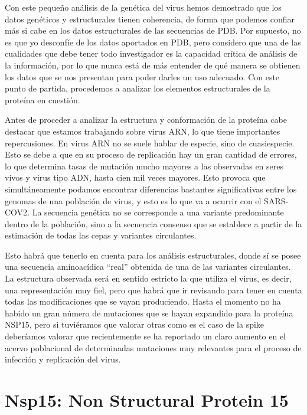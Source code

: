 \documentclass[12pt]{article}
\begin{document}
Con este pequeño análisis de la genética del virus hemos demostrado que los datos genéticos y estructurales tienen coherencia, de forma que podemos confiar más si cabe en los datos estructurales de las secuencias de PDB. Por supuesto, no es que yo desconfíe de los datos aportados en PDB, pero considero que una de las cualidades que debe tener todo investigador es la capacidad crítica de análisis de la información, por lo que nunca está de más entender de qué manera se obtienen los datos que se nos presentan para poder darles un uso adecuado. Con este punto de partida, procedemos a analizar los elementos estructurales de la proteína en cuestión.
\newline


Antes de proceder a analizar la estructura y conformación de la proteína cabe destacar que estamos trabajando sobre virus ARN, lo que tiene importantes repercusiones. En virus ARN no se suele hablar de especie, sino de cuasiespecie. Esto se debe a que en su proceso de replicación hay un gran cantidad de errores, lo que determina tasas de mutación mucho mayores a las observadas en seres vivos y virus tipo ADN, hasta cien mil veces mayores. Esto provoca que simultáneamente podamos encontrar diferencias bastantes significativas entre los genomas de una población de virus, y esto es lo que va a ocurrir con el SARS-COV2. La secuencia genética no se corresponde a una variante predominante dentro de la población, sino a la secuencia consenso que se establece a partir de la estimación de todas las cepas y variantes circulantes. 
\newline

Esto habrá que tenerlo en cuenta para los análisis estructurales, donde sí se posee una secuencia aminoacídica ``real'' obtenida de una de las variantes circulantes. La estructura observada será en sentido estricto la que utiliza el virus, es decir, una representación muy fiel, pero que habrá que ir revisando para tener en cuenta todas las modificaciones que se vayan produciendo. Hasta el momento no ha habido un gran número de mutaciones que se hayan expandido para la proteína NSP15, pero si tuviéramos que valorar otras como es el caso de la spike deberíamos valorar que recientemente se ha reportado un claro aumento en el acervo poblacional de determinadas mutaciones muy relevantes para el proceso de infección y replicación del virus.
\newline

\section{Nsp15: Non Structural Protein 15}
\end{document}
